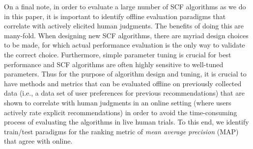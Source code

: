 \COMMENT
On a final note, in order to evaluate a large number of SCF algorithms
as we do in this paper, it is important to identify offline evaluation
paradigms that correlate with actively elicited human judgments.  The
benefits of doing this are many-fold.  When designing new SCF
algorithms, there are myriad design choices to be made, for which
actual performance evaluation is the only way to validate the correct
choice.  Furthermore, simple parameter tuning is crucial for best
performance and SCF algorithms are often highly sensitive to
well-tuned parameters.  Thus for the purpose of algorithm design and
tuning, it is crucial to have methods and metrics that can be
evaluated offline on previously collected data (i.e., a data set of
user preferences for previous recommendations) that are shown to
correlate with human judgments in an online setting (where users
actively rate explicit recommendations) in order to avoid the
time-consuming process of evaluating the algorithms in live human
trials.  To this end, we identify train/test paradigms for the
ranking metric of \emph{mean average precision} (MAP)
that agree with online.
\ENDCOMMENT

